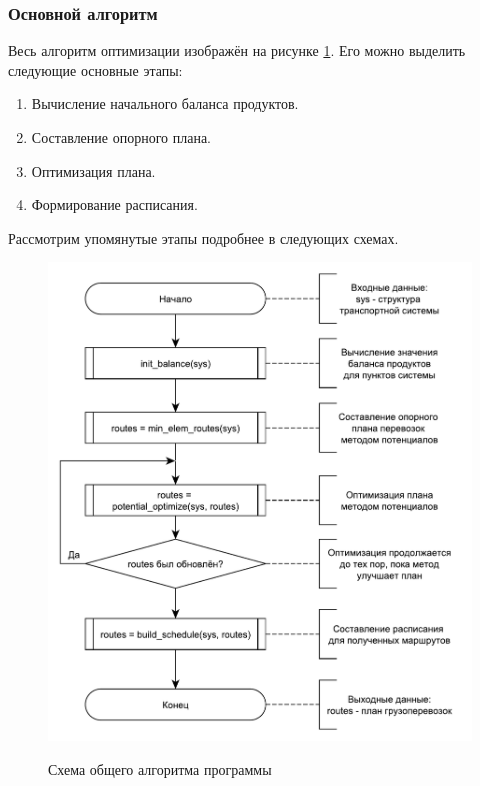 \subsubsection{Основной алгоритм}
Весь алгоритм оптимизации изображён на рисунке \ref{alg:main}. Его можно выделить следующие основные этапы:
\begin{enumerate}
	\item Вычисление начального баланса продуктов.
	\item Составление опорного плана.
	\item Оптимизация плана.
	\item Формирование расписания.
\end{enumerate}

Рассмотрим упомянутые этапы подробнее в следующих схемах.

\pagebreak
\begin{figure}[h]
	\begin{center}
		{\includegraphics[scale=0.7, angle=0, page=1]{img/main_algorithm.pdf}}
		\caption{Схема общего алгоритма программы}
		\label{alg:main}
	\end{center}
\end{figure}


